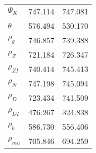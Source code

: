 \begin{center}
\begin{longtable}{lcc}
$ {\Psi_{K}}           $	 & 	     747.114	 & 	     747.081 \\ 
$ {\theta}             $	 & 	     576.494	 & 	     530.170 \\ 
$ {\rho_g}             $	 & 	     746.857	 & 	     739.388 \\ 
$ {\rho_Z}             $	 & 	     721.184	 & 	     726.347 \\ 
$ {\rho_{ZI}}          $	 & 	     740.414	 & 	     745.413 \\ 
$ {\rho_N}             $	 & 	     747.198	 & 	     745.094 \\ 
$ {\rho_D}             $	 & 	     723.434	 & 	     741.509 \\ 
$ {\rho_{DI}}          $	 & 	     476.267	 & 	     324.838 \\ 
$ {\rho_b}             $	 & 	     586.730	 & 	     556.406 \\ 
$ {\rho_{mu}}          $	 & 	     705.846	 & 	     694.259 \\ 
\end{longtable}
 \end{center}
